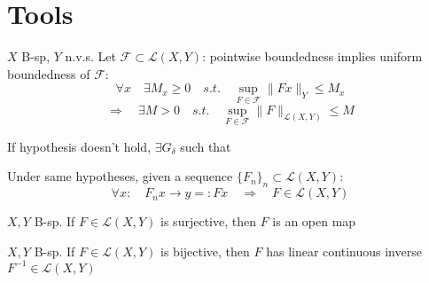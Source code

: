 \iffalse
\section{Tools}
\begin{theorem}
 $X$ B-sp, $Y$ n.v.s. Let $\mathcal{F} \subset \mathcal{L}(X,Y)$: pointwise boundedness implies uniform boundedness of $\mathcal{F}$:
 \[ \forall x \quad \exists M_x\geq 0 \quad s.t. \quad \sup_{F \in \mathcal{F}} \| Fx\|_Y \leq M_x\]
 \[ \Rightarrow \quad \exists M>0 \quad s.t.\quad \sup_{F\in\mathcal{F}}\| F\|_{\mathcal{L}(X,Y)} \leq M\]
\end{theorem}
\begin{remark}
 If hypothesis doesn't hold, $\exists G_\delta$ such that  
\end{remark}
\begin{proposition}
 Under same hypotheses, given a sequence $\{F_n\}_n \subset \mathcal{L}(X,Y)$:
 \[\forall x: \quad F_n x\to y=:Fx\quad \Rightarrow \quad F \in \mathcal{L}(X,Y)
 \]
\end{proposition}

\begin{theorem}
 $X,Y$ B-sp. If $F\in\mathcal{L}(X,Y)$ is surjective, then $F$ is an open map
\end{theorem}
\begin{theorem}
 $X,Y$ B-sp. If $F\in\mathcal{L}(X,Y)$ is bijective, then $F$ has linear continuous inverse $F^{-1}\in \mathcal{L}(X,Y)$ 
\end{theorem}
